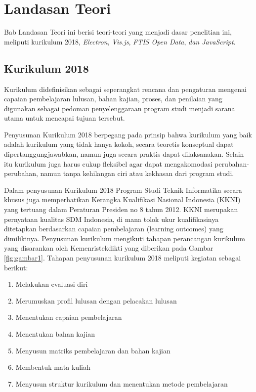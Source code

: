\chapter{Landasan Teori}
\label{chap:teori}
Bab Landasan Teori ini berisi teori-teori yang menjadi dasar penelitian ini, meliputi kurikulum 2018, \textit{Electron}, \textit{Vis.js}, \textit{FTIS Open Data}, \textit{dan JavaScript}.

\section{Kurikulum 2018}
Kurikulum didefinisikan sebagai seperangkat rencana dan pengaturan mengenai capaian pembelajaran lulusan, bahan kajian, proses, dan penilaian yang digunakan sebagai pedoman penyelenggaraan program studi menjadi sarana utama untuk mencapai tujuan tersebut. \cite{kurikulum:2018}

Penyusunan Kurikulum 2018 berpegang pada prinsip bahwa kurikulum yang baik adalah kurikulum yang tidak hanya kokoh, secara teoretis konseptual dapat dipertanggungjawabkan, namun juga secara praktis dapat dilaksanakan. Selain itu kurikulum juga harus cukup fleksibel agar dapat mengakomodasi perubahan-perubahan, namun tanpa kehilangan ciri atau kekhasan dari program studi.

Dalam penyusunan Kurikulum 2018 Program Studi Teknik Informatika secara khusus juga memperhatikan Kerangka Kualifikasi Nasional Indonesia (KKNI) yang tertuang dalam Peraturan Presiden no 8 tahun 2012. KKNI merupakan pernyataan kualitas SDM Indonesia, di mana tolok ukur kualifikasinya ditetapkan berdasarkan capaian pembelajaran (learning outcomes) yang dimilikinya. Penyusunan kurikulum mengikuti tahapan perancangan kurikulum yang disarankan oleh Kemenristekdikti yang diberikan pada Gambar
\ref{fig:gambar1}. Tahapan penyusunan kurikulum 2018 meliputi kegiatan sebagai berikut:

\begin{enumerate}


    \item Melakukan evaluasi diri
    \item Merumuskan profil lulusan dengan pelacakan lulusan
    \item Menentukan capaian pembelajaran
    \item Menentukan bahan kajian
    \item Menyusun matriks pembelajaran dan bahan kajian
    \item Membentuk mata kuliah
    \item Menyusun struktur kurikulum dan menentukan metode pembelajaran
\end{enumerate}

